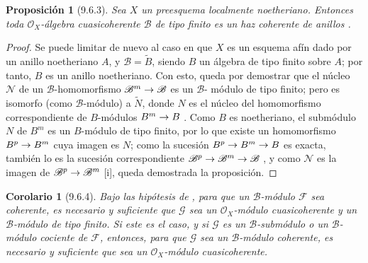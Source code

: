 \documentclass[oneside]{amsart}
\theoremstyle{ega-env-style}
\theoremstyle{ega-thm-env-style}
\newtheorem*{proposition}{Proposición}
\newtheorem*{corollary}{Corolario}
\theoremstyle{ega-defn-env-style}
\renewcommand{\to}{\mathchoice{\longrightarrow}{\rightarrow}{\rightarrow}{\rightarrow}}
\newcommand{\oldpage}[2][]{{\marginnote{\normalfont{\textbf{#1}~|~#2}}}\ignorespaces}
\let\EGAOriginalLabel\label
\renewcommand{\label}[1]{\phantomsection\EGAOriginalLabel{#1}}
\begin{document}
\begin{proposition}[9.6.3]
\label{I.9.6.3}
Sea $X$ un preesquema localmente noetheriano.
Entonces toda $\mathscr{O}_X$-álgebra cuasicoherente $\mathscr{B}$ de tipo finito es un haz coherente de anillos .
\end{proposition}

\begin{proof}
Se puede limitar de nuevo al caso en que $X$ es un esquema afín dado por un anillo noetheriano $A$, y $\mathscr{B}=\widetilde{B}$, siendo $B$ un álgebra de tipo finito sobre $A$; por tanto, $B$ es un anillo noetheriano.
Con esto, queda por demostrar que el núcleo $\mathscr{N}$ de un $\mathscr{B}$-homomorfismo $\mathscr{B}^m\to\mathscr{B}$ es un $\mathscr{B}$-
\oldpage[I]{180}
módulo de tipo finito; pero es isomorfo (como $\mathscr{B}$-módulo) a $\widetilde{N}$, donde $N$ es el núcleo del homomorfismo correspondiente de $B$-módulos $B^m\to B$ .
Como $B$ es noetheriano, el submódulo $N$ de $B^m$ es un $B$-módulo de tipo finito, por lo que existe un homomorfismo $B^p\to B^m$ cuya imagen es $N$; como la sucesión $B^p\to B^m\to B$ es exacta, también lo es la sucesión correspondiente $\mathscr{B}^p\to\mathscr{B}^m\to\mathscr{B}$ , y como $\mathscr{N}$ es la imagen de $\mathscr{B}^p\to\mathscr{B}^m$ [i], queda demostrada la proposición.
\end{proof}

\begin{corollary}[9.6.4]
\label{I.9.6.4}
Bajo las hipótesis de , para que un $\mathscr{B}$-módulo $\mathscr{F}$ sea coherente, es necesario y suficiente que $\mathscr{G}$ sea un $\mathscr{O}_X$-módulo cuasicoherente y un $\mathscr{B}$-módulo de tipo finito.
Si este es el caso, y si $\mathscr{G}$ es un $\mathscr{B}$-submódulo o un $\mathscr{B}$-módulo cociente de $\mathscr{F}$, entonces, para que $\mathscr{G}$ sea un $\mathscr{B}$-módulo coherente, es necesario y suficiente que sea un $\mathscr{O}_X$-módulo cuasicoherente.
\end{corollary}
\end{document}
